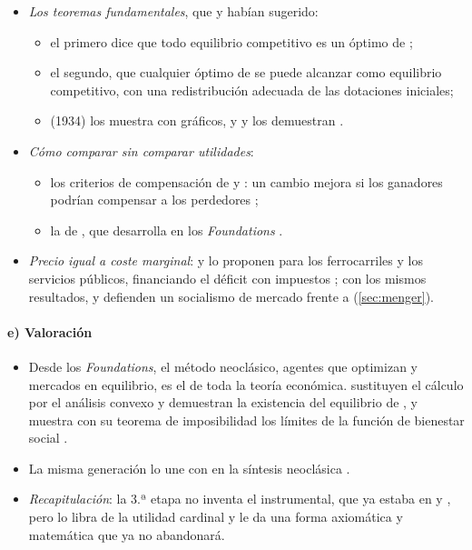 \documentclass[11pt]{article}
\begin{document}
\begin{itemize}
\item \emph{Los teoremas fundamentales}, que  y  habían sugerido\nocite{HET2026Paretian}:
  \begin{itemize}
  \item el primero dice que todo equilibrio competitivo es un óptimo de ;
  \item el segundo, que cualquier óptimo de  se puede alcanzar como equilibrio competitivo, con una redistribución adecuada de las dotaciones iniciales;
  \item {} (1934) los muestra con gráficos, y \textcite{Lange1942Foundations} y \textcite{Allais1943Recherche} los demuestran\nocite{HET2026Paretian} .
  \end{itemize}
\item \emph{Cómo comparar sin comparar utilidades}:
  \begin{itemize}
  \item los criterios de compensación de \textcite{Kaldor1939Welfare} y \textcite{Hicks1939Foundations}: un cambio mejora si los ganadores podrían compensar a los perdedores ;
  \item la  de \textcite{Bergson1938Reformulation}, que  desarrolla en los \emph{Foundations} .
  \end{itemize}
\item \emph{Precio igual a coste marginal}:  \parencite*{Lerner1934Concept} y \textcite{Hotelling1938General} lo proponen para los ferrocarriles y los servicios públicos, financiando el déficit con impuestos ; con los mismos resultados, \textcite{Lange1936Socialism} y  defienden un socialismo de mercado frente a  (\ref{sec:menger}).
\end{itemize}

\paragraph{e) Valoración}

\begin{itemize}
\item Desde los \emph{Foundations}, el método neoclásico, agentes que optimizan y mercados en equilibrio, es el de toda la teoría económica. \textcite{ArrowDebreu1954Existence} sustituyen el cálculo por el análisis convexo y demuestran la existencia del equilibrio de  , y \textcite{Arrow1951Social} muestra con su teorema de imposibilidad los límites de la función de bienestar social .
\item La misma generación lo une con  en la síntesis neoclásica .
\item \emph{Recapitulación}: la 3.ª etapa no inventa el instrumental, que ya estaba en  y , pero lo libra de la utilidad cardinal y le da una forma axiomática y matemática que ya no abandonará.
\end{itemize}
\end{document}
